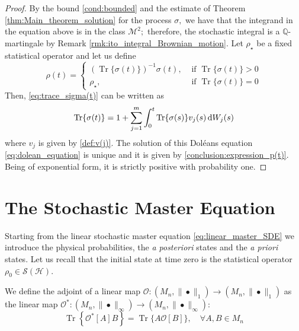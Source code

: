 \begin{proof}
	 By the bound \eqref{cond:bounded} and the estimate of Theorem \ref{thm:Main_theorem_solution} for the process $\sigma,$ we have that the integrand in the equation above is in the class $\mathcal{M}^{2} ;$ therefore, the stochastic integral is a $\mathbb{Q}$-martingale by Remark \ref{rmk:ito_integral_Brownian_motion}.
	 Let $\rho_{\star}$ be a fixed statistical operator and let us define
	 \[ \rho(t)=\left\{\begin{array}{ll}(\operatorname{Tr}\{\sigma(t)\})^{-1} \sigma(t), & \text { if } \operatorname{Tr}\{\sigma(t)\}>0 \\ \rho_{\star}, & \text { if } \operatorname{Tr}\{\sigma(t)\}=0\end{array}\right. \] Then, \eqref{eq:trace_sigma(t)} can be written as
	 \[ \operatorname{Tr}\{\sigma(t)\}=1+\sum_{j=1}^{m} \int_{0}^{t} \operatorname{Tr}\{\sigma(s)\} v_{j}(s) \,\mathrm{d} W_{j}(s) \]
	 where $v_{j}$ is given by \eqref{def:v(j)}. The solution of this Doléans equation \eqref{eq:dolean_equation} is unique and it is given by \eqref{conclusion:expression_p(t)}. Being of exponential form, it is strictly positive with probability one.
\end{proof}




\section{The Stochastic Master Equation}
  Starting from the linear stochastic master equation \eqref{eq:linear_master_SDE} we introduce the physical probabilities, the \textit{a posteriori} states and the \textit{a priori} states. Let us recall that the initial state at time zero is the statistical operator $\rho_{0} \in \mathcal{S}(\mathcal{H})$.

We define the adjoint of a linear map $\mathcal{O}:\left(M_{n},\|\bullet\|_{1}\right) \rightarrow\left(M_{n},\|\bullet\|_{1}\right)$ as the linear map $ \mathcal{O}^{*}:\left(M_{n},\|\bullet\|_{\infty}\right) \rightarrow\left(M_{n},\|\bullet\|_{\infty}\right)$:
\[
\operatorname{Tr}\left\{\mathcal{O}^{*}[A] B\right\}=\operatorname{Tr}\{A \mathcal{O}[B]\}, \quad \forall A, B \in M_{n}
\]

